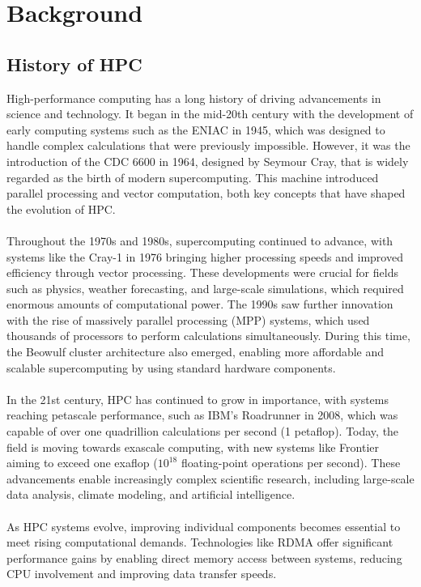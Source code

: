 \chapter{Background}

\section{History of HPC}
High-performance computing has a long history of driving advancements in science and technology. It began in the mid-20th century with the development of early computing systems such as the ENIAC in 1945, which was designed to handle complex calculations that were previously impossible. However, it was the introduction of the CDC 6600 in 1964, designed by Seymour Cray, that is widely regarded as the birth of modern supercomputing.\cite{cook2015history} This machine introduced parallel processing and vector computation, both key concepts that have shaped the evolution of HPC. 
\\\\
Throughout the 1970s and 1980s, supercomputing continued to advance, with systems like the Cray-1 in 1976 bringing higher processing speeds and improved efficiency through vector processing. These developments were crucial for fields such as physics, weather forecasting, and large-scale simulations, which required enormous amounts of computational power. The 1990s saw further innovation with the rise of massively parallel processing (MPP) systems, which used thousands of processors to perform calculations simultaneously. During this time, the Beowulf cluster architecture also emerged, enabling more affordable and scalable supercomputing by using standard hardware components.
\\\\
In the 21st century, HPC has continued to grow in importance, with systems reaching petascale performance, such as IBM’s Roadrunner in 2008, which was capable of over one quadrillion calculations per second (1 petaflop). Today, the field is moving towards exascale computing, with new systems like Frontier aiming to exceed one exaflop ($10^{18}$ floating-point operations per second).\cite{top500_2024} These advancements enable increasingly complex scientific research, including large-scale data analysis, climate modeling, and artificial intelligence.
\\\\
As HPC systems evolve, improving individual components becomes essential to meet rising computational demands. Technologies like RDMA offer significant performance gains by enabling direct memory access between systems, reducing CPU involvement and improving data transfer speeds. 

